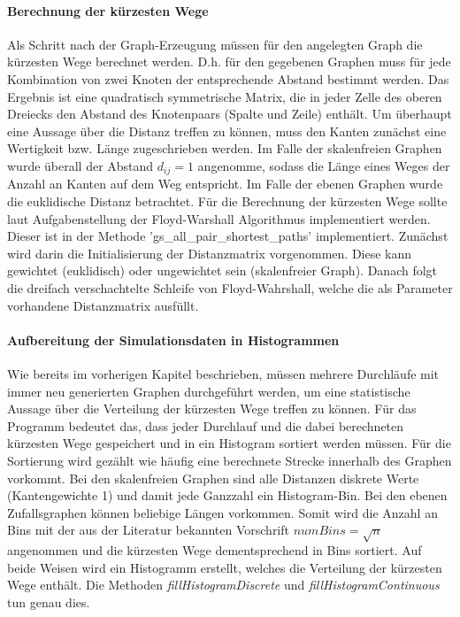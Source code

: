 \documentclass[10pt]{article}
\begin{document}
\paragraph{Berechnung der kürzesten Wege}
Als Schritt nach der Graph-Erzeugung müssen für den angelegten Graph die kürzesten Wege berechnet werden. D.h. für den gegebenen Graphen muss für jede Kombination von zwei Knoten der entsprechende Abstand bestimmt werden. Das Ergebnis ist eine quadratisch symmetrische Matrix, die in jeder Zelle des oberen Dreiecks den Abstand des Knotenpaars (Spalte und Zeile) enthält. 
Um überhaupt eine Aussage über die Distanz treffen zu können, muss den Kanten zunächst eine Wertigkeit bzw. Länge zugeschrieben werden. Im Falle der skalenfreien Graphen wurde überall der Abstand $d_{ij}=1$ angenomme, sodass die Länge eines Weges der Anzahl an Kanten auf dem Weg entspricht. Im Falle der ebenen Graphen wurde die euklidische Distanz betrachtet. Für die Berechnung der kürzesten Wege sollte laut Aufgabenstellung der Floyd-Warshall Algorithmus implementiert werden. Dieser ist in der Methode 'gs\_all\_pair\_shortest\_paths' implementiert. Zunächst wird darin die Initialisierung der Distanzmatrix vorgenommen. Diese kann gewichtet (euklidisch) oder ungewichtet sein (skalenfreier Graph). Danach folgt die dreifach verschachtelte Schleife von Floyd-Wahrshall, welche die als Parameter vorhandene Distanzmatrix ausfüllt.

\paragraph{Aufbereitung der Simulationsdaten in Histogrammen}
Wie bereits im vorherigen Kapitel beschrieben, müssen mehrere Durchläufe mit immer neu generierten Graphen durchgeführt werden, um eine statistische Aussage über die Verteilung der kürzesten Wege treffen zu können. Für das Programm bedeutet das, dass jeder Durchlauf und die dabei berechneten kürzesten Wege gespeichert und in ein Histogram sortiert werden müssen. Für die Sortierung wird gezählt wie häufig eine berechnete Strecke innerhalb des Graphen vorkommt. Bei den skalenfreien Graphen sind alle Distanzen diskrete Werte (Kantengewichte 1) und damit jede Ganzzahl ein Histogram-Bin. Bei den ebenen Zufallsgraphen können beliebige Längen vorkommen. Somit wird die Anzahl an Bins mit der aus der Literatur bekannten Vorschrift $numBins=\sqrt{n}$ angenommen und die kürzesten Wege dementsprechend in Bins sortiert.
Auf beide Weisen wird ein Histogramm erstellt, welches die Verteilung der kürzesten Wege enthält. Die Methoden \textit{fillHistogramDiscrete} und \textit{fillHistogramContinuous} tun genau dies.
\end{document}
